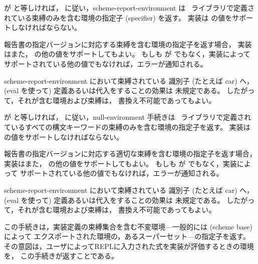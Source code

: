 \begin{entry}{%
}

 が {} と等しければ，
\rfivers に従い，{\cf scheme-report-environment} は
\rfivers\ ライブラリで定義されている束縛のみを含む環境の指定子 (specifier) を返す。
実装は  の値をサポートしなければならない。

報告書の指定バージョンに対応する束縛を含む環境の指定子を返す場合，
実装はまた，  の他の値をサポートしてもよい。
もしも  が {} でもなく，実装によって
サポートされている他の値でもなければ，エラーが通知される。

{\cf scheme-report-environment} において束縛されている
識別子 (たとえば {\cf car}) へ，({\cf eval} を使って) 定義あるいは代入をすることの効果は
未規定である。
したがって，それが含む環境および束縛は，
書換え不可能であってもよい。

\end{entry}

\begin{entry}{%
}

 が {} と等しければ，
\rfivers に従い，{\cf null-environment} 手続きは
\rfivers\ ライブラリで定義されているすべての構文キーワードの束縛のみを含む環境の指定子を返す。
実装は  の値をサポートしなければならない。

報告書の指定バージョンに対応する適切な束縛を含む環境の指定子を返す場合，
実装はまた，  の他の値をサポートしてもよい。
もしも  が {} でもなく，実装によって
サポートされている他の値でもなければ，エラーが通知される。

{\cf scheme-report-environment} において束縛されている
識別子 (たとえば {\cf car}) へ，({\cf eval} を使って) 定義あるいは代入をすることの効果は
未規定である。
したがって，それが含む環境および束縛は，
書換え不可能であってもよい。

\end{entry}

\begin{entry}{%
}

この手続きは，実装定義の束縛集合を含む不変環境---一般的には {\cf(scheme base)} によって
エクスポートされた環境の，あるスーパーセット---の指定子を返す。
その意図は，ユーザによってREPLに入力された式を実装が評価するときの環境を，
この手続きが返すことである。

\end{entry}

